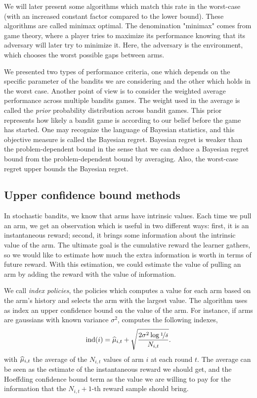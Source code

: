 {We will later present some algorithms which match this rate in the worst-case (with an increased constant factor compared to the lower bound). These algorithms are called minimax optimal.  The denomination "minimax" comes from game theory, where a player tries to maximize its performance knowing that its adversary will later try to minimize it. Here, the adversary is the environment, which chooses the worst possible gaps between arms. 

We presented two types of performance criteria, one which depends on the specific parameter of the bandits we are considering and the other which holds in the worst case. Another point of view is to consider the weighted average performance across multiple bandits games. The weight used in the average is called the \emph{prior} probability distribution across bandit games. This prior represents how likely a bandit game is according to our belief before the game has started. One may recognize the language of Bayesian statistics, and this objective measure is called the Bayesian regret. Bayesian regret is weaker than the problem-dependent bound in the sense that we can deduce a Bayesian regret bound from the problem-dependent bound by averaging. Also, the worst-case regret upper bounds the Bayesian regret.


\subsection{Upper confidence bound methods}
In stochastic bandits, we know that arms have intrinsic values. Each time we pull an arm, we get an observation which is useful in two different ways: first, it is an instantaneous reward; second, it brings some information about the intrinsic value of the arm. The ultimate goal is the cumulative reward the learner gathers, so we would like to estimate how much the extra information is worth in terms of future reward. With this estimation, we could estimate the value of pulling an arm by adding the reward with the value of information. 

We call \emph{index policies}, the policies which computes a value for each arm based on the arm's history and selects the arm with the largest value. The \UCB algorithm uses as index an upper confidence bound on the value of the arm. For instance, if arms are gaussians with known variance $\sigma^2$, \UCB computes the following indexes,
\begin{equation}
\label{eq:ucb}
\text{ind}(i) = \widehat{\mu}_{i,t} + \sqrt{\frac{2\sigma^2 \log{\nicefrac{1}{\delta}}}{N_{i,t}}}.
\end{equation}
with $\widehat{\mu}_{i,t}$ the average of the $N_{i,t}$ values of arm $i$ at each round $t$.  The average can be seen as the estimate of the instantaneous reward we should get, and the Hoeffding confidence bound term as the value we are willing to pay for the information that the $N_{i,t}+1$-th reward sample should bring. 

}
